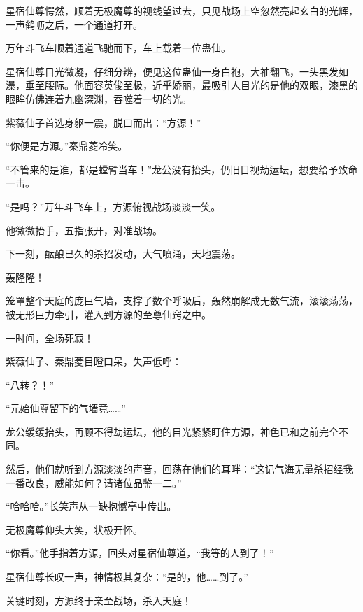 \begin{this_body}
星宿仙尊愕然，顺着无极魔尊的视线望过去，只见战场上空忽然亮起玄白的光辉，一声鹤呖之后，一个通道打开。

万年斗飞车顺着通道飞驰而下，车上载着一位蛊仙。

星宿仙尊目光微凝，仔细分辨，便见这位蛊仙一身白袍，大袖翻飞，一头黑发如瀑，垂至腰际。他面容英俊至极，近乎娇丽，最吸引人目光的是他的双眼，漆黑的眼眸仿佛连着九幽深渊，吞噬着一切的光。

紫薇仙子首选身躯一震，脱口而出：“方源！”

“你便是方源。”秦鼎菱冷笑。

“不管来的是谁，都是螳臂当车！”龙公没有抬头，仍旧目视劫运坛，想要给予致命一击。

“是吗？”万年斗飞车上，方源俯视战场淡淡一笑。

他微微抬手，五指张开，对准战场。

下一刻，酝酿已久的杀招发动，大气喷涌，天地震荡。

轰隆隆！

笼罩整个天庭的庞巨气墙，支撑了数个呼吸后，轰然崩解成无数气流，滚滚荡荡，被无形巨力牵引，灌入到方源的至尊仙窍之中。

一时间，全场死寂！

紫薇仙子、秦鼎菱目瞪口呆，失声低呼：

“八转？！”

“元始仙尊留下的气墙竟……”

龙公缓缓抬头，再顾不得劫运坛，他的目光紧紧盯住方源，神色已和之前完全不同。

然后，他们就听到方源淡淡的声音，回荡在他们的耳畔：“这记气海无量杀招经我一番改良，威能如何？请诸位品鉴一二。”

“哈哈哈。”长笑声从一缺抱憾亭中传出。

无极魔尊仰头大笑，状极开怀。

“你看。”他手指着方源，回头对星宿仙尊道，“我等的人到了！”

星宿仙尊长叹一声，神情极其复杂：“是的，他……到了。”

关键时刻，方源终于亲至战场，杀入天庭！

\end{this_body}

